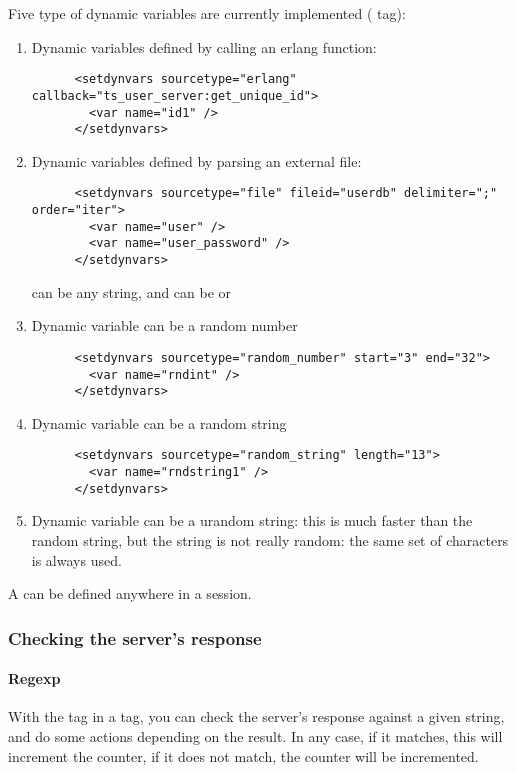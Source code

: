 \documentclass{IDXDOC-en}
\begin{document}
Five type of dynamic variables are currently implemented ( tag):
\begin{enumerate}
\item Dynamic variables defined by calling an erlang function:
\begin{Verbatim}
      <setdynvars sourcetype="erlang" callback="ts_user_server:get_unique_id">
        <var name="id1" />
      </setdynvars>
\end{Verbatim}
\item Dynamic variables defined by parsing an external file:
\begin{Verbatim}
      <setdynvars sourcetype="file" fileid="userdb" delimiter=";" order="iter">
        <var name="user" />
        <var name="user_password" />
      </setdynvars>
\end{Verbatim}
 can be any string, and  can be
 or 
\item Dynamic variable can be a random number
\begin{Verbatim}
      <setdynvars sourcetype="random_number" start="3" end="32">
        <var name="rndint" />
      </setdynvars>
\end{Verbatim}
\item Dynamic variable can be a random string
\begin{Verbatim}
      <setdynvars sourcetype="random_string" length="13">
        <var name="rndstring1" />
      </setdynvars>
\end{Verbatim}
\item Dynamic variable can be a urandom string: this is much faster than
  the random string, but the string is not really random: the same set
  of characters is always used.
\end{enumerate}

A  can be defined anywhere in a session.

\subsubsection{Checking the server's response}

\paragraph{Regexp}

With the tag  in a  tag, you can check
the server's response against a given string, and do some actions
depending on the result. In any case, if it matches, this will
increment the  counter, if it does not match, the
 counter will be incremented.
\end{document}

